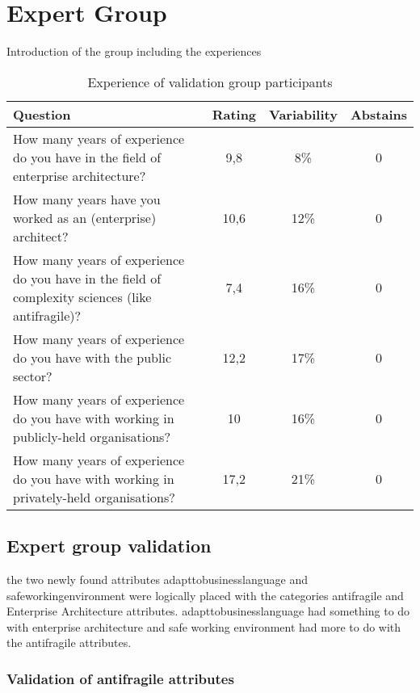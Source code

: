 \chapter{Expert Group}
\label{ch:expertgroup}

Introduction of the group including the experiences

\begin{table}[!h]
	\centering
	\begin{tabular}{p{}ccc}
		\toprule
		\textbf{Question} & \textbf{Rating} & \textbf{Variability} & \textbf{Abstains} \\
		\midrule
		How many years of experience do you have in the field of enterprise architecture? & 9,8 & 8\% & 0 \\%
		How many years have you worked as an (enterprise) architect? & 10,6 & 12\% & 0 \\%
		How many years of experience do you have in the field of complexity sciences (like antifragile)? & 7,4 & 16\% & 0 \\%
		How many years of experience do you have with the public sector? & 12,2 & 17\% & 0 \\%
		How many years of experience do you have with working in publicly-held organisations? & 10 & 16\% & 0 \\%
		How many years of experience do you have with working in privately-held organisations? & 17,2 & 21\% & 0 \\%
		\bottomrule
	\end{tabular}%
	\caption{Experience of validation group participants}
	\label{tab:experiencevalidationgroup}%
\end{table}%
\newpage

\section{Expert group validation}
\label{sec:expertgroupvalidation}

the two newly found attributes \gls{adapttobusinesslanguage} and \gls{safeworkingenvironment} were logically placed with the categories antifragile and Enterprise Architecture attributes. \Gls{adapttobusinesslanguage} had something to do with enterprise architecture and safe working environment had more to do with the antifragile attributes.


\subsection{Validation of antifragile attributes}
\label{sub:validationofantifragileattributes}

